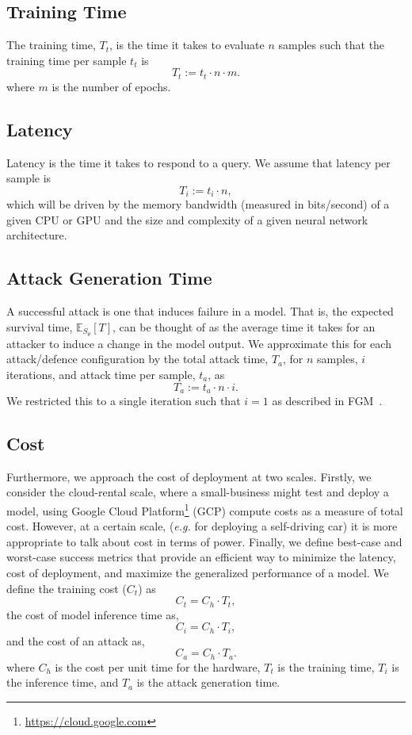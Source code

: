 \documentclass[journal]{IEEEtran}
\begin{document}
\subsection{Training Time}
The training time, $T_t$, is the time it takes to evaluate $n$ samples such that the training time per sample $t_t$ is
$$
    T_t := t_t \cdot n  \cdot m.
$$
where $m$ is the number of epochs.

\subsection{Latency}
Latency is the time it takes to respond to a query. We assume that latency per sample is
$$
    T_i := t_i \cdot n,
$$
which will be driven by the memory bandwidth (measured in bits/second) of a given CPU or GPU and the size\cite{vgg} and complexity\cite{resnet} of a given neural network architecture.


\subsection{Attack Generation Time}
A successful attack is one that induces failure in a model. That is, the expected survival time, $\mathbb{E}_{S_\theta}[T]$, can be thought of as the average time it takes for an attacker to induce a change in the model output. We approximate this for each attack/defence configuration by the total attack time, $T_a$, for $n$ samples, $i$ iterations, and attack time per sample, $t_a$, as
\begin{equation}
    \label{attack_time}
    T_a := t_a \cdot n \cdot i.
\end{equation}
We restricted this to a single iteration such that $i =1$ as described in FGM~\cite{fgm}.


\subsection{Cost}
Furthermore, we approach the cost of deployment at two scales. Firstly, we consider the cloud-rental scale, where a small-business might test and deploy a model, using Google Cloud Platform\footnote{\href{https://cloud.google.com}{https://cloud.google.com}} (GCP) compute costs as a measure of total cost. However, at a certain scale, (\textit{e.g.} for deploying a self-driving car) it is  more appropriate to talk about cost in terms of power. Finally, we define best-case and worst-case success metrics that provide an efficient way to minimize the latency, cost of deployment, and 
maximize the generalized performance of a model. We define the training cost ($C_t$) as
$$
    C_t = C_h \cdot T_t,
    \label{eq:cost_training}
$$
the cost of model inference time as,
$$
    C_i = C_h \cdot T_i,
    \label{eq:cost_inference}
$$
and the cost of an attack as,
$$
    C_a = C_h \cdot T_a.
    \label{eq:cost_attack}
$$
where $C_h$ is the cost per unit time for the hardware, $T_t$ is the training time, $T_i$ is the inference time, and $T_a$ is the attack generation time.
\end{document}
